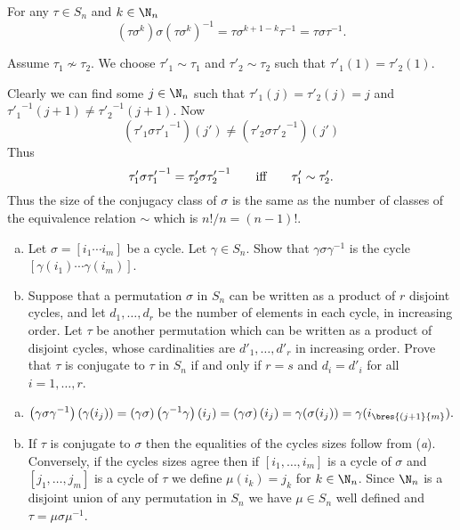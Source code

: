 \documentclass[12pt]{book}
\newcounter{myenumi}
\newenvironment{myenumerate}
{\begin{enumerate}
 \setcounter{enumi}{\themyenumi}
}
{\setcounter{myenumi}{\theenumi}
 \end{enumerate}}
\begin{document}
\begin{myenumerate}
For any \(\tau\in S_n\) and \(k \in \N_n\)
\begin{equation*}
(\tau\sigma^k)\sigma\left(\tau\sigma^k\right)^{-1}
= \tau\sigma^{k+1-k}\tau^{-1}
= \tau\sigma\tau^{-1}.
\end{equation*}

Assume \(\tau_1 \nsim \tau_2\).
We choose \(\tau'_1 \sim \tau_1\)
and \(\tau'_2 \sim \tau_2\)
such that 
\(\tau'_1(1) = \tau'_2(1)\).

Clearly we can find some \(j\in\N_n\) such that
\(\tau'_1(j) = \tau'_2(j) = j\)
and
\({\tau'_1}^{-1}(j + 1) \neq {\tau'_2}^{-1}(j + 1)\).
Now
\begin{equation*}
\left(\tau'_1 \sigma {\tau'_1}^{-1}\right)(j')
\neq
\left(\tau'_2 \sigma {\tau'_2}^{-1}\right)(j')
\end{equation*}
Thus 
\begin{equation*}
\tau'_1 \sigma {\tau'_1}^{-1}
=
\tau'_2 \sigma {\tau'_2}^{-1}
\qquad \textnormal{iff} \qquad
\tau'_1 \sim \tau'_2.
\end{equation*}
Thus the size of the conjugacy class of \(\sigma\)
is the same as the number of classes of the equivalence relation \(\sim\)
which is \(n!/n = (n-1)!\).

\begin{excopy}
\begin{enumerate}[(a)]
\item
Let \(\sigma = [i_1\cdots i_m]\) be a cycle.
Let \(\gamma \in S_n\). Show that \(\gamma\sigma\gamma^{-1}\)
is  the cycle \([\gamma(i_1)\cdots \gamma(i_m)]\).
\item
Suppose that a permutation \(\sigma\) in \(S_n\) can be written
as a product of $r$ disjoint
cycles, and let \(d_1,\ldots,d_r\) be the number of elements in each cycle,
in increasing order.
 Let \(\tau\) be another permutation which can be written as a product of
disjoint cycles, whose cardinalities are
\(d'_1,\ldots,d'_r\)
in increasing order. Prove
that \(\tau\) is conjugate to \(\tau\) in \(S_n\) if and only if
\(r = s\) and \(d_i = d'_i\) for all \(i=1,\ldots,r\).
\end{enumerate}
\end{excopy}

\begin{enumerate}[(a)]
\item
\begin{equation*}
\left(\gamma\sigma\gamma^{-1}\right)(\gamma(i_j)) 
= \left(\gamma\sigma\right)\left(\gamma^{-1}\gamma\right)(i_j)
= \left(\gamma\sigma\right)(i_j)
= \gamma(\sigma(i_j))
= \gamma(i_{\bres{(j+1}{m}}).
\end{equation*}
\item
If \(\tau\) is conjugate to \(\sigma\) then the equalities
of the cycles sizes follow from (\emph{a}).
Conversely, if the cycles sizes agree then
if \([i_1,\ldots,i_m]\) is a cycle of \(\sigma\)
and  \([j_1,\ldots,j_m]\) is a cycle of \(\tau\)
we define \(\mu(i_k)=j_k\) for \(k\in \N_n\).
Since \(\N_n\) is a disjoint union of any permutation in \(S_n\)
we have \(\mu\in S_n\) well defined 
and \(\tau = \mu\sigma\mu^{-1}\).
\end{enumerate}


\end{myenumerate}
\end{document}
